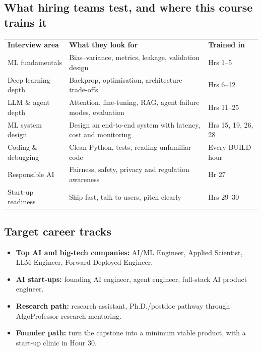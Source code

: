 \documentclass[11pt,a4paper]{article}
\begin{document}
\subsection*{What hiring teams test, and where this course trains it}
\small
{}
\begin{tabularx}{\linewidth}{@{}L{4.6cm} Y L{2.6cm}@{}}
\color{gold}\sffamily\bfseries Interview area & \color{gold}\sffamily\bfseries What they look for & \color{gold}\sffamily\bfseries Trained in\\
ML fundamentals & Bias--variance, metrics, leakage, validation design & Hrs 1--5\\
Deep learning depth & Backprop, optimisation, architecture trade-offs & Hrs 6--12\\
LLM \& agent depth & Attention, fine-tuning, RAG, agent failure modes, evaluation & Hrs 11--25\\
ML system design & Design an end-to-end system with latency, cost and monitoring & Hrs 15, 19, 26, 28\\
Coding \& debugging & Clean Python, tests, reading unfamiliar code & Every BUILD hour\\
Responsible AI & Fairness, safety, privacy and regulation awareness & Hr 27\\
Start-up readiness & Ship fast, talk to users, pitch clearly & Hrs 29--30\\
\end{tabularx}
\normalsize

\subsection*{Target career tracks}
\begin{itemize}
  \item \textbf{Top AI and big-tech companies:} AI/ML Engineer, Applied Scientist, LLM Engineer, Forward Deployed Engineer.
  \item \textbf{AI start-ups:} founding AI engineer, agent engineer, full-stack AI product engineer.
  \item \textbf{Research path:} research assistant, Ph.D./postdoc pathway through AlgoProfessor research mentoring.
  \item \textbf{Founder path:} turn the capstone into a minimum viable product, with a start-up clinic in Hour 30.
\end{itemize}
\end{document}
